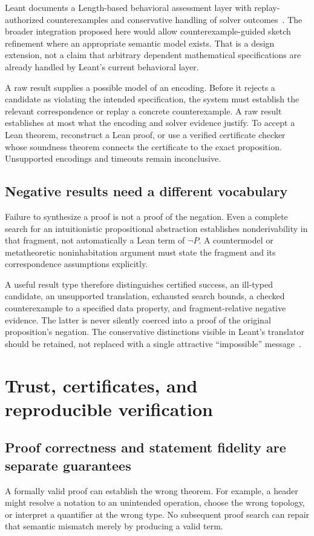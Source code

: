 \documentclass[11pt,letterpaper]{article}
\theoremstyle{definition}
\theoremstyle{remark}
\newcommand{\code}[1]{\texttt{\detokenize{#1}}}
\begin{document}
Leant documents a Length-based behavioral assessment layer with replay-authorized counterexamples and conservative handling of solver outcomes~\cite{leant-readme,synth-internals}. The broader integration proposed here would allow counterexample-guided sketch refinement where an appropriate semantic model exists. That is a design extension, not a claim that arbitrary dependent mathematical specifications are already handled by Leant's current behavioral layer.

A raw \code{sat} result supplies a possible model of an encoding. Before it rejects a candidate as violating the intended specification, the system must establish the relevant correspondence or replay a concrete counterexample. A raw \code{unsat} result establishes at most what the encoding and solver evidence justify. To accept a Lean theorem, reconstruct a Lean proof, or use a verified certificate checker whose soundness theorem connects the certificate to the exact proposition. Unsupported encodings and timeouts remain inconclusive.

\subsection{Negative results need a different vocabulary}
Failure to synthesize a proof is not a proof of the negation. Even a complete search for an intuitionistic propositional abstraction establishes nonderivability in that fragment, not automatically a Lean term of $\neg P$. A countermodel or metatheoretic noninhabitation argument must state the fragment and its correspondence assumptions explicitly.

A useful result type therefore distinguishes certified success, an ill-typed candidate, an unsupported translation, exhausted search bounds, a checked counterexample to a specified data property, and fragment-relative negative evidence. The latter is never silently coerced into a proof of the original proposition's negation. The conservative distinctions visible in Leant's translator should be retained, not replaced with a single attractive ``impossible'' message~\cite{fragment,leant-readme}.

\section{Trust, certificates, and reproducible verification}
\label{sec:trust}
\subsection{Proof correctness and statement fidelity are separate guarantees}
A formally valid proof can establish the wrong theorem. For example, a header might resolve a notation to an unintended operation, choose the wrong topology, or interpret a quantifier at the wrong type. No subsequent proof search can repair that semantic mismatch merely by producing a valid term.
\end{document}
